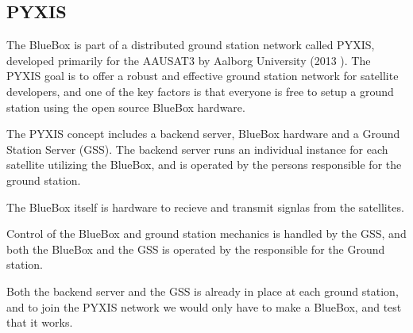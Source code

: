 \subsection{PYXIS}
The BlueBox is part of a distributed ground station network called PYXIS, developed primarily for the AAUSAT3 by Aalborg University (2013 \cite{aausat3}). The PYXIS goal is to offer a robust and effective ground station network for satellite developers, and one of the key factors is that everyone is free to setup a ground station using the open source BlueBox hardware. 

The PYXIS concept includes a backend server, BlueBox hardware and a Ground Station Server (GSS). The backend server runs an individual instance for each satellite utilizing the BlueBox, and is operated by the persons responsible for the ground station. 

The BlueBox itself is hardware to recieve and transmit signlas from the satellites.

Control of the BlueBox and ground station mechanics is handled by the GSS, and both the BlueBox and the GSS is operated by the responsible for the Ground station. 

Both the backend server and the GSS is already in place at each ground station, and to join the PYXIS network we would only have to make a BlueBox, and test that it works.